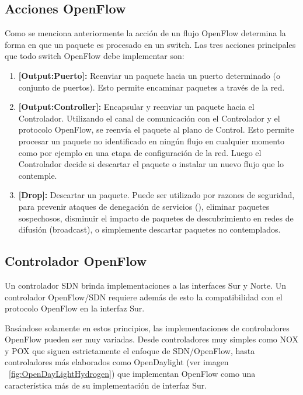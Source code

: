 \subsection{Acciones OpenFlow}

Como se menciona anteriormente la acci\'on de un flujo OpenFlow determina la forma en que un paquete es procesado en un switch. Las tres acciones principales que todo switch OpenFlow debe implementar son:

\begin{enumerate}
\item \textbf{[Output:Puerto]:} Reenviar un paquete hacia un puerto determinado (o conjunto de puertos). Esto permite encaminar paquetes a través de la red.

\item \textbf{[Output:Controller]:} Encapsular y reenviar un paquete hacia el Controlador. Utilizando el canal de comunicación con el Controlador y el protocolo OpenFlow, se reenvía el paquete al plano de Control. Esto permite procesar un paquete no identificado en ningún flujo en cualquier momento como por ejemplo en una etapa de configuración de la red. Luego el Controlador decide si descartar el paquete o instalar un nuevo flujo que lo contemple.

\item \textbf{[Drop]:} Descartar un paquete. Puede ser utilizado por razones de seguridad, para prevenir ataques de denegación de servicios (), eliminar paquetes sospechosos, disminuir el impacto de paquetes de descubrimiento en redes de difusión (broadcast), o simplemente descartar paquetes no contemplados.
\end{enumerate}

\subsection{Controlador OpenFlow}
Un controlador SDN brinda implementaciones a las interfaces Sur y Norte. Un controlador OpenFlow/SDN requiere adem\'as de esto la compatibilidad con el protocolo OpenFlow en la interfaz Sur. 

Basándose solamente en estos principios, las implementaciones de controladores OpenFlow pueden ser muy variadas. Desde controladores muy simples como NOX\cite{ControllersNOX} y POX\cite{ControllersPOX} que siguen estrictamente el enfoque de SDN/OpenFlow, hasta controladores m\'as elaborados como OpenDaylight \cite{ControllersOpendaylight} (ver imagen ~\ref{fig:OpenDayLightHydrogen}) que implementan OpenFlow como una característica m\'as de su implementaci\'on de interfaz Sur.

